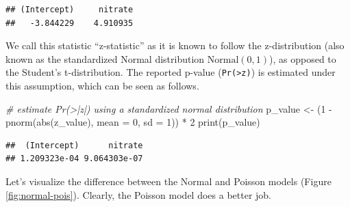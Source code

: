 \documentclass[
]{book}
\newenvironment{Shaded}{\begin{snugshade}}{\end{snugshade}}
\newcommand{\AttributeTok}[1]{\textcolor[rgb]{0.77,0.63,0.00}{#1}}
\newcommand{\CommentTok}[1]{\textcolor[rgb]{0.56,0.35,0.01}{\textit{#1}}}
\newcommand{\DecValTok}[1]{\textcolor[rgb]{0.00,0.00,0.81}{#1}}
\newcommand{\FunctionTok}[1]{\textcolor[rgb]{0.00,0.00,0.00}{#1}}
\newcommand{\NormalTok}[1]{#1}
\newcommand{\OtherTok}[1]{\textcolor[rgb]{0.56,0.35,0.01}{#1}}
\newcommand{\SpecialCharTok}[1]{\textcolor[rgb]{0.00,0.00,0.00}{#1}}
\begin{document}
\begin{verbatim}
## (Intercept)     nitrate 
##   -3.844229    4.910935
\end{verbatim}

We call this statistic ``z-statistic'' as it is known to follow the z-distribution (also known as the standardized Normal distribution \(\text{Normal}(0, 1)\)), as opposed to the Student's t-distribution. The reported p-value (\texttt{Pr(\textgreater{}\textbar{}z\textbar{})}) is estimated under this assumption, which can be seen as follows.

\begin{Shaded}
\begin{Highlighting}[]
\CommentTok{\# estimate Pr(\textgreater{}|z|) using a standardized normal distribution}
\NormalTok{p\_value }\OtherTok{\textless{}{-}}\NormalTok{ (}\DecValTok{1} \SpecialCharTok{{-}} \FunctionTok{pnorm}\NormalTok{(}\FunctionTok{abs}\NormalTok{(z\_value), }\AttributeTok{mean =} \DecValTok{0}\NormalTok{, }\AttributeTok{sd =} \DecValTok{1}\NormalTok{)) }\SpecialCharTok{*} \DecValTok{2}
\FunctionTok{print}\NormalTok{(p\_value)}
\end{Highlighting}
\end{Shaded}

\begin{verbatim}
##  (Intercept)      nitrate 
## 1.209323e-04 9.064303e-07
\end{verbatim}

Let's visualize the difference between the Normal and Poisson models (Figure \ref{fig:normal-pois}). Clearly, the Poisson model does a better job.
\end{document}
